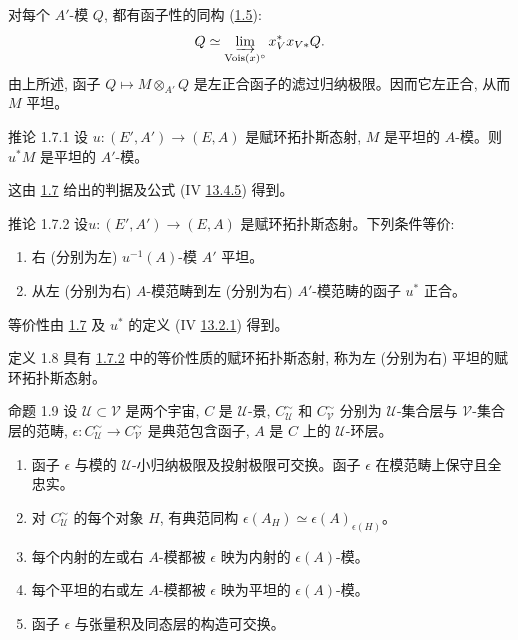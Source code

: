 对每个 $A'$-模 $Q$, 都有函子性的同构 (\hyperref[V.prop1.5]{1.5}):
$$
Q\simeq \varinjlim_{\operatorname{Vois}(x)^{\circ}}x_V^{\ast}x_{V\ast}Q{}.
$$
由上所述, 函子 $Q\mapsto M\otimes_{A'}Q$ 是左正合函子的滤过归纳极限。因而它左正合, 从而 $M$ 平坦。

\begin{enonce*}{推论 1.7.1}
设 $u:(E',A')\to(E,A)$ 是赋环拓扑斯态射, $M$ 是平坦的 $A$-模。则 $u^{\ast}M$ 是平坦的 $A'$-模。
\end{enonce*}

这由 \hyperref[V.prop1.7]{1.7} 给出的判据及公式 (IV \hyperlink{sga4.exp.IV.equation.13.4.5}{13.4.5}) 得到。

\begin{enonce*}{推论 1.7.2}
设\pageoriginale $u:(E',A')\to(E,A)$ 是赋环拓扑斯态射。下列条件等价:
\begin{enumerate}
\renewcommand{\theenumi}{\roman{enumi}}
\renewcommand{\labelenumi}{\theenumi)}
\item 右 (分别为左) $u^{-1}(A)$-模 $A'$ 平坦。
\item 从左 (分别为右) $A$-模范畴到左 (分别为右) $A'$-模范畴的函子 $u^{\ast}$ 正合。
\end{enumerate}
\end{enonce*}

等价性由 \hyperref[V.prop1.7]{1.7} 及 $u^{\ast}$ 的定义 (IV \hyperref[IV.subsubsec13.2.1]{13.2.1}) 得到。

\begin{enonce*}{定义 1.8}
具有 \hyperref[V.cor1.7.2]{1.7.2} 中的等价性质的赋环拓扑斯态射, 称为左 (分别为右) 平坦的赋环拓扑斯态射。
\end{enonce*}

\begin{enonce*}{命题 1.9}
设 $𝒰\subset 𝒱$ 是两个宇宙, $C$ 是 $𝒰$-景, $C^{\sim}_{𝒰}$ 和 $C^{\sim}_{𝒱}$ 分别为 $𝒰$-集合层与 $𝒱$-集合层的范畴, $\epsilon:C^{\sim}_{𝒰}\to C^{\sim}_{𝒱}$ 是典范包含函子, $A$ 是 $C$ 上的 $𝒰$-环层。
\begin{enumerate}
\renewcommand{\labelenumi}{\theenumi)}
\item 函子 $\epsilon$ 与模的 $𝒰$-小归纳极限及投射极限可交换。函子 $\epsilon$ 在模范畴上保守且全忠实。

\item 对 $C^{\sim}_{𝒰}$ 的每个对象 $H$, 有典范同构 $\epsilon(A_H)\simeq \epsilon(A)_{\epsilon(H)}$。

\item 每个内射的左或右 $A$-模都被 $\epsilon$ 映为内射的 $\epsilon(A)$-模。

\item 每个平坦的右或左 $A$-模都被 $\epsilon$ 映为平坦的 $\epsilon(A)$-模。

\item 函子 $\epsilon$ 与张量积及同态层的构造可交换。
\end{enumerate}
\end{enonce*}


